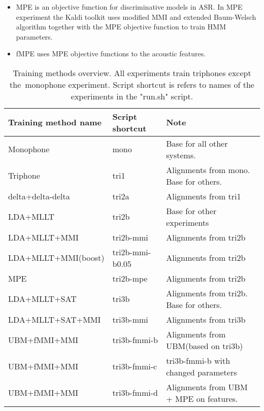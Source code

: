 {\begin{itemize}
    \item {} \ac{MPE}\cite{povey2007evaluation} is an objective function for discriminative models in \ac{ASR}. In \ac{MPE} experiment the Kaldi toolkit uses modified \ac{MMI} and extended Baum-Welsch algorithm together with the \ac{MPE} objective function to train \ac{HMM} parameters.
    \item \cite{povey2005fmpe} \ac{fMPE} uses \ac{MPE} objective functions to the acoustic features. 
\end{itemize}
\begin{table}[!htp]\label{tab:disc_train}
\small{\begin{tabular}{lll}
\hline
Training method name & Script shortcut & Note\\
\hline
Monophone & mono & Base for all other systems.\\
Triphone  & tri1 &  Alignments from mono. Base for others.\\
delta+delta-delta & tri2a & Alignments from tri1 \\
\ac{LDA}+\ac{MLLT} & tri2b &  Base for other experiments \\
\ac{LDA}+\ac{MLLT}+\ac{MMI} & tri2b-mmi & Alignments from tri2b \\
\ac{LDA}+\ac{MLLT}+\ac{MMI}(boost) & tri2b-mmi-b0.05  & Alignments from tri2b \\
\ac{MPE} & tri2b-mpe & Alignments from tri2b \\
\ac{LDA}+\ac{MLLT}+\ac{SAT} & tri3b & Alignments from tri2b. Base for others. \\
\ac{LDA}+\ac{MLLT}+\ac{SAT}+\ac{MMI} & tri3b-mmi  & Alignments from tri3b \\
\ac{UBM}+\ac{fMMI}+\ac{MMI} & tri3b-fmmi-b & Alignments from \ac{UBM}(based on tri3b) \\
\ac{UBM}+\ac{fMMI}+\ac{MMI} & tri3b-fmmi-c & tri3b-fmmi-b with changed parameters \\
\ac{UBM}+\ac{fMMI}+\ac{MMI} & tri3b-fmmi-d & Alignments from \ac{UBM} + \ac{MPE} on features.\\ 
\end{tabular}}
\caption{Training methods overview. All experiments train triphones except the~monophone experiment. Script shortcut is refers to names of the experiments in the "run.sh" script.}
\end{table}


}
